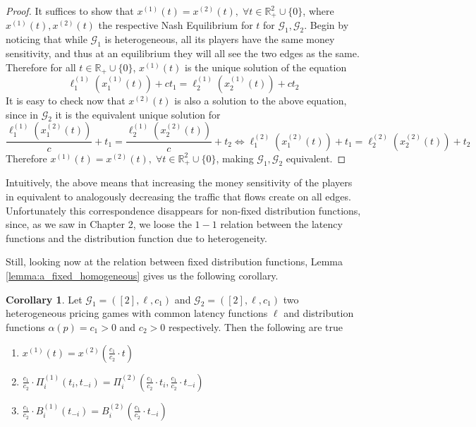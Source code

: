 \documentclass[10pt,a4paper]{book}
\newcommand{\R}{\mathbb{R}}
\newcommand{\Gm}{\mathcal{G}}
\theoremstyle{definition}
\newtheorem{corollary}[definition]{Corollary}
\theoremstyle{comment}
\begin{document}
\begin{proof}
	It suffices to show that $x^{(1)}(t) = x^{(2)}(t), \; \forall t \in \R_+^2 \cup \{0\}$, where $x^{(1)}(t), x^{(2)}(t)$ the respective Nash Equilibrium for $t$ for $\Gm_1, \Gm_2$.
	Begin by noticing that while $\Gm_1$ is heterogeneous, all its players have the same money sensitivity, and thus at an equilibrium they will all see the two edges as the same.
	Therefore for all $t \in \R_+ \cup \{0\}$, $x^{(1)}(t)$ is the unique solution of the equation
	\[
		\ell_1^{(1)}(x_1^{(1)}(t)) + ct_1 = \ell_2^{(1)}(x_2^{(1)}(t)) + ct_2
	\]
	It is easy to check now that $x^{(2)}(t)$ is also a solution to the above equation, since in $\Gm_2$ it is the equivalent unique solution for
	\[
		\frac{\ell_1^{(1)}(x_1^{(2)}(t))}{c} + t_1 = \frac{\ell_2^{(1)}(x_2^{(2)}(t))}{c} + t_2 \Leftrightarrow \ell_1^{(2)}(x_1^{(2)}(t)) + t_1 = \ell_2^{(2)}(x_2^{(2)}(t)) + t_2
	\]
	Therefore $x^{(1)}(t) = x^{(2)}(t), \; \forall t \in \R_+^2 \cup \{0\}$, making $\Gm_1, \Gm_2$ equivalent.
\end{proof}
Intuitively, the above means that increasing the money sensitivity of the players in equivalent to analogously decreasing the traffic that flows create on all edges.
Unfortunately this correspondence  disappears for non-fixed distribution functions, since, as we saw in Chapter 2, we loose the $1-1$ relation between the latency functions and the distribution function due to heterogeneity.

Still, looking now at the relation between fixed distribution functions, Lemma \ref{lemma:a_fixed_homogeneous} gives us the following corollary.
\begin{corollary}
	\label{corollary:a_fixed_c_relation}
	Let $\Gm_1 = ([2], \ell, c_1)$ and $\Gm_2 = ([2], \ell, c_1)$ two heterogeneous pricing games with common latency functions $\ell$ and distribution functions $\alpha(p) = c_1 > 0$ and $c_2 > 0$ respectively.
	Then the following are true
	\begin{enumerate}[$(i)$]
		\item $x^{(1)}(t) = x^{(2)}\left(\frac{c_1}{c_2} \cdot t\right)$
		\item $\frac{c_1}{c_2} \cdot \Pi_i^{(1)}(t_i, t_{-i}) = \Pi_i^{(2)}\left(\frac{c_1}{c_2} \cdot t_i, \frac{c_1}{c_2} \cdot t_{-i}\right)$
		\item $\frac{c_1}{c_2} \cdot B_i^{(1)}(t_{-i}) = B_i^{(2)}\left(\frac{c_1}{c_2} \cdot t_{-i}\right)$
	\end{enumerate}
\end{corollary}
\end{document}
